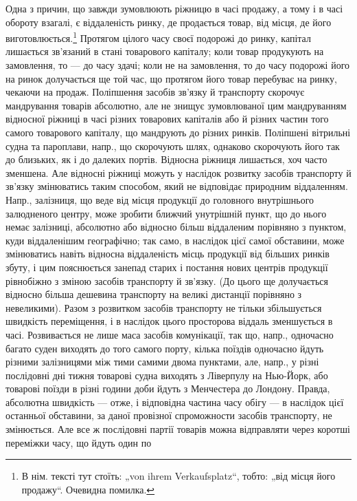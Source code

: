 Одна з причин, що завжди зумовлюють ріжницю в часі продажу, а
тому і в часі обороту взагалі, є віддаленість ринку, де продається товар,
від місця, де його виготовлюється.\footnote*{
В нім. тексті тут стоїть: „von ihrem Verkaufsplatz“, тобто: „від місця його продажу“.
Очевидна помилка. 
} Протягом цілого часу своєї подорожі
до ринку, капітал лишається зв’язаний в стані товарового капіталу;
коли товар продукують на замовлення, то — до часу здачі; коли не на замовлення,
то до часу подорожі його на ринок долучається ще той час,
що протягом його товар перебуває на ринку, чекаючи на продаж. Поліпшення
засобів зв’язку й транспорту скорочує мандрування товарів абсолютно,
але не знищує зумовлюваної цим мандруванням відносної ріжниці
в часі різних товарових капіталів або й різних частин того самого товарового
капіталу, що мандрують до різних ринків. Поліпшені вітрильні
судна та пароплави, напр., що скорочують шлях, однаково скорочують
його так до близьких, як і до далеких портів. Відносна ріжниця лишається,
хоч часто зменшена. Але відносні ріжниці можуть у наслідок розвитку
засобів транспорту й зв’язку змінюватись таким способом, який не відповідає
природним віддаленням. Напр., залізниця, що веде від місця продукції до
головного внутрішнього залюдненого центру, може зробити ближчий
унутрішній пункт, що до нього немає залізниці, абсолютно або відносно
більш віддаленим порівняно з пунктом, куди віддаленішим географічно; так
само, в наслідок цієї самої обставини, може змінюватись навіть відносна
віддаленість місць продукції від більших ринків збуту, і цим пояснюється
занепад старих і постання нових центрів продукції рівнобіжно з зміною
засобів транспорту й зв’язку. (До цього ще долучається відносно більша
дешевина транспорту на великі дистанції порівняно з невеликими). Разом
з розвитком засобів транспорту не тільки збільшується швидкість
переміщення, і в наслідок цього просторова віддаль зменшується в часі.
Розвивається не лише маса засобів комунікації, так що, напр., одночасно
багато суден виходять до того самого порту, кілька поїздів одночасно
йдуть різними залізницями між тими самими двома пунктами, але, напр.,
у різні послідовні дні тижня товарові судна виходять з Ліверпулу на
Нью-Йорк, або товарові поїзди в різні години доби йдуть з Менчестера
до Лондону. Правда, абсолютна швидкість — отже, і відповідна частина
часу обігу — в наслідок цієї останньої обставини, за даної провізної спроможности
засобів транспорту, не змінюється. Але все ж послідовні партії товарів
можна відправляти через коротші переміжки часу, що йдуть один по
